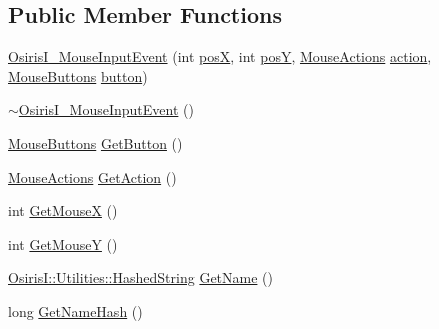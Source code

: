 \subsection*{Public Member Functions}
\begin{DoxyCompactItemize}
\item 
\hyperlink{struct_osiris_i_1_1_events_1_1_osiris_i___mouse_input_event_a98e26fc6b2648c31861e575862271682}{Osiris\-I\-\_\-\-Mouse\-Input\-Event} (int \hyperlink{struct_osiris_i_1_1_events_1_1_osiris_i___mouse_input_event_a6bb12656332b418e6dc01faec54b20f5}{pos\-X}, int \hyperlink{struct_osiris_i_1_1_events_1_1_osiris_i___mouse_input_event_accc04535d428763c593b2abcd34bebdd}{pos\-Y}, \hyperlink{namespace_osiris_i_1_1_events_acfad4999b4155d29322b52fa50c40d08}{Mouse\-Actions} \hyperlink{struct_osiris_i_1_1_events_1_1_osiris_i___mouse_input_event_a76685c868136effe69d1017f313125f3}{action}, \hyperlink{namespace_osiris_i_1_1_events_aea8719a5bb7bb7a2296aa7469d9163e1}{Mouse\-Buttons} \hyperlink{struct_osiris_i_1_1_events_1_1_osiris_i___mouse_input_event_a04d6abe02f44e7fd0fcf8802dd5f0e4a}{button})
\item 
\hyperlink{struct_osiris_i_1_1_events_1_1_osiris_i___mouse_input_event_a7f0bb99d127e942dc91a30de6c8b72c9}{$\sim$\-Osiris\-I\-\_\-\-Mouse\-Input\-Event} ()
\item 
\hyperlink{namespace_osiris_i_1_1_events_aea8719a5bb7bb7a2296aa7469d9163e1}{Mouse\-Buttons} \hyperlink{struct_osiris_i_1_1_events_1_1_osiris_i___mouse_input_event_aabca96bea1d234cd466c5d45437ea27e}{Get\-Button} ()
\item 
\hyperlink{namespace_osiris_i_1_1_events_acfad4999b4155d29322b52fa50c40d08}{Mouse\-Actions} \hyperlink{struct_osiris_i_1_1_events_1_1_osiris_i___mouse_input_event_aa4298c64020e33ac9c6032c52a1f9402}{Get\-Action} ()
\item 
int \hyperlink{struct_osiris_i_1_1_events_1_1_osiris_i___mouse_input_event_a5153e68525d6d2a7c3d3bf55c676ca17}{Get\-Mouse\-X} ()
\item 
int \hyperlink{struct_osiris_i_1_1_events_1_1_osiris_i___mouse_input_event_a67265efd61bc9aa49cb1bead0e331728}{Get\-Mouse\-Y} ()
\item 
\hyperlink{class_osiris_i_1_1_utilities_1_1_hashed_string}{Osiris\-I\-::\-Utilities\-::\-Hashed\-String} \hyperlink{struct_osiris_i_1_1_events_1_1_osiris_i___mouse_input_event_a669160c810c792156ff68b18e91e0bab}{Get\-Name} ()
\item 
long \hyperlink{struct_osiris_i_1_1_events_1_1_osiris_i___mouse_input_event_a0d214f16be1601ccbb1b7b3b3b9833e9}{Get\-Name\-Hash} ()
\end{DoxyCompactItemize}
